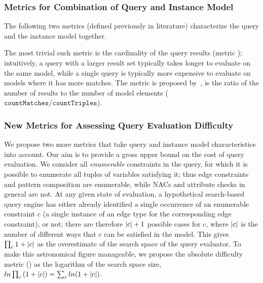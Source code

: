 \subsubsection{Metrics for Combination of Query and Instance Model}
The following two metrics (defined previously in literature) characterize the
query and the instance model together.

The most trivial such metric is the cardinality of the query results (metric
); intuitively, a query with a larger result set typically
takes longer to evaluate on the same model, while a single query is typically
more expensive to evaluate on models where it has more matches. The metric
 is proposed by~\cite{SPLODGE}, is the ratio of the
number of results to the number of model elements (\ie $\mathtt{countMatches}/\mathtt{countTriples}$).


\subsubsection{New Metrics for Assessing Query Evaluation Difficulty}
We propose two more metrics that take query and instance model characteristics into account. 
Our aim is to provide a gross upper bound on
the cost of query evaluation. We consider all \emph{enumerable} constraints in
the query, for which it is possible to enumerate all tuples of variables
satisfying it; thus edge constraints and pattern composition are enumerable,
while NACs and attribute checks in general are not. At any given state of
evaluation, a hypothetical search-based query engine has either already
identified a single occurrence of an enumerable constraint $c$ (\eg a single
instance of an edge type for the corresponding edge constraint), or not; there
are therefore $|{c}|+1$ possible cases for $c$, where $|{c}|$ is the number
of different ways that $c$ can be satisfied in the model. This gives
$\prod_{c}{1+|{c}|}$ as the overestimate of the search space of the query
evaluator. To make this astronomical figure manageable, we propose the absolute
difficulty metric () as the logarithm of the search space
size, \ie $ln\prod_{c}{(1+|{c}|)} = \sum_{c}{ln(1+|{c}|)}$.
 
